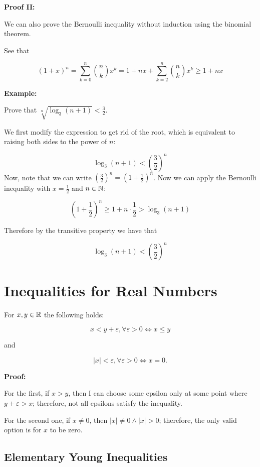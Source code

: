 \QED

\textbf{Proof II:}

We can also prove the Bernoulli inequality without induction using the binomial theorem.

See that

\[
	(1 + x)^n = \sum_{k = 0}^{n} \binom{n}{k} x^k = 1 + nx + \sum_{k = 2}^{n} \binom{n}{k} x^k	\ge 1 + nx
\]
\QED

\textbf{Example:}

Prove that \(\sqrt[n]{\log_3 (n + 1)} < \frac{3}{2}\).

We first modify the expression to get rid of the root, which is equivalent to raising both sides to the power of \(n\):

\[
	\log_3 (n + 1) < \left(\frac{3}{2}\right)^n
\]
Now, note that we can write \(\left(\frac{3}{2}\right)^n = \left(1 + \frac{1}{2}\right)^n\).
Now we can apply the Bernoulli inequality with \(x = \frac{1}{2}\) and \(n \in \mathbb{N}\):

\[
	\left(1 + \frac{1}{2}\right)^n \ge 1 + n \cdot \frac{1}{2} > \log_3 (n + 1)
\]

Therefore by the transitive property we have that

\[
	\log_3 (n + 1) < \left(\frac{3}{2}\right)^n
\]

\QED

\section{Inequalities for Real Numbers}

For \(x,y \in \mathbb{R}\) the following holds:

\[
	x < y + \varepsilon, \forall \varepsilon > 0 \iff x \le y
\]

and

\[
	|x| < \varepsilon, \forall \varepsilon > 0 \iff x = 0.
\]

\textbf{Proof:}

For the first, if \(x > y\), then I can choose some epsilon only at some point where \(y + \varepsilon > x\); therefore,
not all epsilons satisfy the inequality.

For the second one, if \(x \ne 0\), then \(|x| \ne 0 \land |x| > 0\); therefore, the only valid option is for
\(x\) to be zero.

\QED

\subsection{Elementary Young Inequalities}

